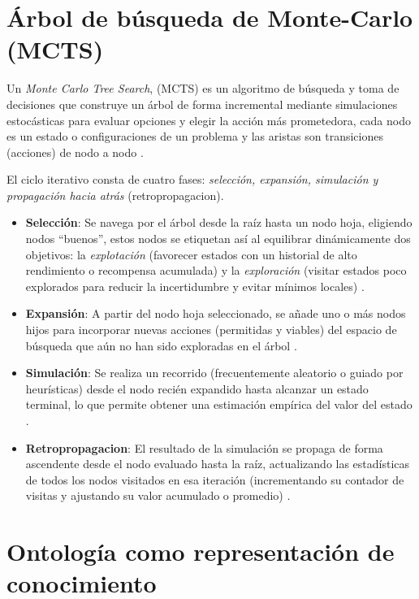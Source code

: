 \documentclass[12pt, letterpaper, oneside]{book}
\begin{document}
\section{Árbol de búsqueda de Monte-Carlo (MCTS)}
Un \textit{Monte Carlo Tree Search}, (MCTS) es un algoritmo de búsqueda y toma de decisiones que construye un árbol de forma incremental mediante simulaciones estocásticas para evaluar opciones y elegir la acción más prometedora, cada nodo es un estado o configuraciones de un problema y las aristas son transiciones (acciones) de nodo a nodo \cite{mctswiechowski2022}.

El ciclo iterativo consta de cuatro fases: \textit{selección, expansión, simulación y propagación hacia atrás} (retropropagacion). 

\begin{itemize}

\item \textbf{Selección}: Se navega por el árbol desde la raíz hasta un nodo hoja, eligiendo nodos “buenos”, estos nodos se etiquetan así al equilibrar dinámicamente dos objetivos: la \textit{explotación} (favorecer estados con un historial de alto rendimiento o recompensa acumulada) y la \textit{exploración} (visitar estados poco explorados para reducir la incertidumbre y evitar mínimos locales) \cite{mctswiechowski2022}.

\item \textbf{Expansión}: A partir del nodo hoja seleccionado, se añade uno o más nodos hijos para incorporar nuevas acciones  (permitidas y viables) del espacio de búsqueda que aún no han sido exploradas en el árbol \cite{mctswiechowski2022}.

\item \textbf{Simulación}: Se realiza un recorrido (frecuentemente aleatorio o guiado por heurísticas) desde el nodo recién expandido hasta alcanzar un estado terminal, lo que permite obtener una estimación empírica del valor del estado \cite{mctswiechowski2022}. 

\item \textbf{Retropropagacion}: El resultado de la simulación se propaga de forma ascendente desde el nodo evaluado hasta la raíz, actualizando las estadísticas de todos los nodos visitados en esa iteración (incrementando su contador de visitas y ajustando su valor acumulado o promedio) \cite{mctswiechowski2022}.

\end{itemize}


\section{Ontología como representación de conocimiento} 
\end{document}
